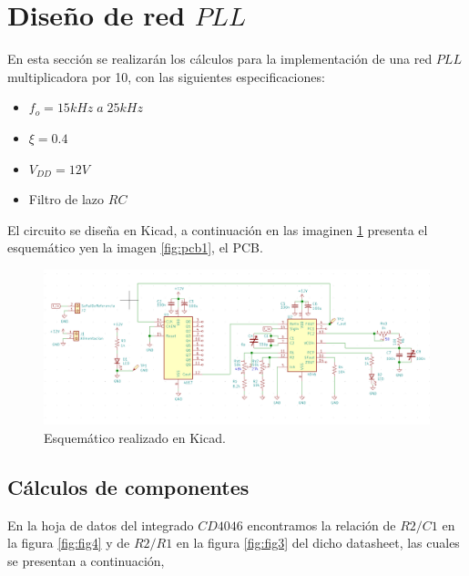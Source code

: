 \documentclass[twocolumn]{article}
\begin{document}
\section{Diseño de red $PLL$}
En esta sección se realizarán los cálculos para la implementación de una red $PLL$ multiplicadora por 10, con las siguientes especificaciones:
\begin{itemize}\itemsep0em
\item $f_o = 15 kHz \; a  \; 25kHz $
	\item $\xi = 0.4$
	\item $V_{DD} = 12 V$
	\item Filtro de lazo $RC$
\end{itemize}

El circuito se diseña en Kicad, a continuación en las imaginen \textcolor{blue}{{\ref{fig:sch}}} presenta el esquemático yen la imagen \textcolor{blue}{{\ref{fig:pcb1}}}, el PCB.
\begin{figure}[H]
  \centering    
  \includegraphics[width=\columnwidth]{imagenes/sch.jpg}
	\caption{Esquemático realizado en Kicad.}\label{fig:sch}
\end{figure}

\subsection{Cálculos de componentes}
En la hoja de datos del integrado $CD4046$ encontramos la relación de $R2/C1$ en la figura \textcolor{blue}{{\ref{fig:fig4}}} y de $R2/R1$ en la figura \textcolor{blue}{{\ref{fig:fig3}}} del dicho datasheet, las cuales se presentan a continuación, 
\end{document}
